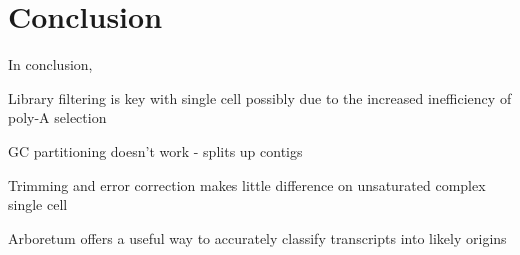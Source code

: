 \section{Conclusion}
In conclusion,

Library filtering is key with single cell possibly due to the increased inefficiency of poly-A selection

GC partitioning doesn't work - splits up contigs

Trimming and error correction makes little difference on unsaturated complex single cell 

Arboretum offers a useful way to accurately classify transcripts into likely origins 



